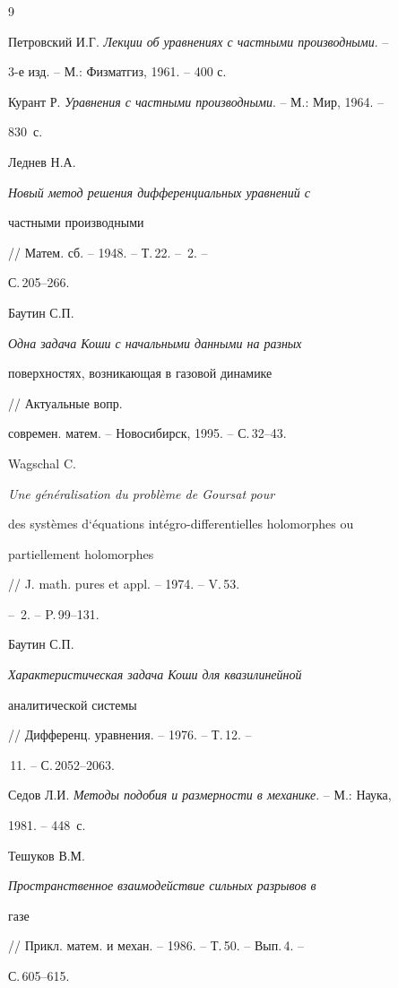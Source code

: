 \begin{thebibliography}{9}







Петровский И.Г. {\em Лекции об уравнениях с частными производными}. --


3-е изд. -- М.: Физматгиз, 1961. -- 400 с.




Курант Р. {\em Уравнения с частными производными}. -- М.: Мир, 1964. -- 


830~с.




Леднев Н.А. {\em Новый метод решения дифференциальных уравнений с


частными производными} // Матем. сб. -- 1948. -- Т.\,22. -- \No\,2. --


С.\,205--266.




Баутин С.П. {\em Одна задача Коши с начальными данными на разных


поверхностях, возникающая в газовой динамике} // Актуальные вопр.


современ. матем. -- Новосибирск, 1995. -- С.\,32--43.




Wagschal C. {\em Une g\'en\'eralisation du probl\`eme de Goursat pour


des syst\`emes d`\'equations int\'egro-differentielles holomorphes ou


partiellement holomorphes} // J. math. pures et appl. -- 1974. -- V.\,53.


-- \No\,2. -- P.\,99--131.




Баутин С.П. {\em Характеристическая задача Коши для квазилинейной


аналитической системы} // Дифференц. уравнения. -- 1976. -- Т.\,12. --


\No\,11. -- С.\,2052--2063.




Седов Л.И. {\em Методы подобия и размерности в механике}. -- М.: Наука,


1981. -- 448~с.




Тешуков В.М. {\em Пространственное взаимодействие сильных разрывов в


газе} // Прикл. матем. и механ. -- 1986. -- Т.\,50. -- Вып.\,4. --


С.\,605--615.








\end{thebibliography}





\vskip 2cm









\smallskip











